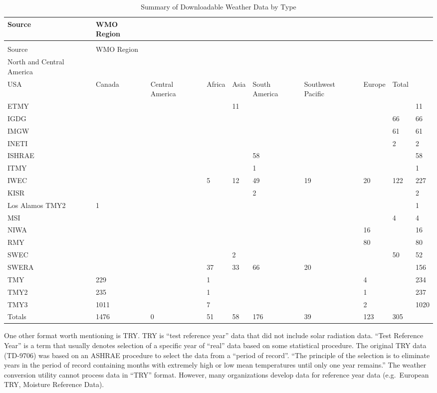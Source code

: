 \begin{longtable}[c]{p{0.6in}p{0.6in}p{0.6in}p{0.6in}p{0.6in}p{0.6in}p{0.6in}p{0.6in}p{0.6in}p{0.6in}}
\caption{Summary of Downloadable Weather Data by Type \label{table:summary-of-downloadable-weather-data-by-type}} \tabularnewline
\toprule 
Source & WMO Region &  \tabularnewline
\midrule
\endfirsthead

\caption[]{Summary of Downloadable Weather Data by Type} \tabularnewline
\toprule 
Source & WMO Region &  \tabularnewline
\midrule
\endhead

North and Central America &  &  &  &  &  &  \tabularnewline
USA & Canada & Central America & Africa & Asia & South America & Southwest Pacific & Europe & Total \tabularnewline
ETMY &  &  &  & 11 &  &  &  &  & 11 \tabularnewline
IGDG &  &  &  &  &  &  &  & 66 & 66 \tabularnewline
IMGW &  &  &  &  &  &  &  & 61 & 61 \tabularnewline
INETI &  &  &  &  &  &  &  & 2 & 2 \tabularnewline
ISHRAE &  &  &  &  & 58 &  &  &  & 58 \tabularnewline
ITMY &  &  &  &  & 1 &  &  &  & 1 \tabularnewline
IWEC &  &  & 5 & 12 & 49 & 19 & 20 & 122 & 227 \tabularnewline
KISR &  &  &  &  & 2 &  &  &  & 2 \tabularnewline
Los Alamos TMY2 & 1 &  &  &  &  &  &  &  & 1 \tabularnewline
MSI &  &  &  &  &  &  &  & 4 & 4 \tabularnewline
NIWA &  &  &  &  &  &  & 16 &  & 16 \tabularnewline
RMY &  &  &  &  &  &  & 80 &  & 80 \tabularnewline
SWEC &  &  &  & 2 &  &  &  & 50 & 52 \tabularnewline
SWERA &  &  & 37 & 33 & 66 & 20 &  &  & 156 \tabularnewline
TMY & 229 &  & 1 &  &  &  & 4 &  & 234 \tabularnewline
TMY2 & 235 &  & 1 &  &  &  & 1 &  & 237 \tabularnewline
TMY3 & 1011 &  & 7 &  &  &  & 2 &  & 1020 \tabularnewline
Totals & 1476 & 0 & 51 & 58 & 176 & 39 & 123 & 305 &  \tabularnewline
\bottomrule
\end{longtable}

One other format worth mentioning is TRY. TRY is ``test reference year'' data that did not include solar radiation data. ``Test Reference Year'' is a term that usually denotes selection of a specific year of ``real'' data based on some statistical procedure. The original TRY data (TD-9706) was based on an ASHRAE procedure to select the data from a ``period of record''. ``The principle of the selection is to eliminate years in the period of record containing months with extremely high or low mean temperatures until only one year remains.'' The weather conversion utility cannot process data in ``TRY'' format. However, many organizations develop data for reference year data (e.g.~European TRY, Moisture Reference Data).

